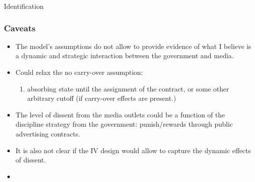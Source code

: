 \documentclass[10pt,aspectratio=169]{beamer}
\begin{document}
\begin{frame}{Identification}\frametitle{Caveats}
\small 
\begin{itemize}
    \item The model's assumptions do not allow to provide evidence of what I believe is a dynamic and strategic interaction between the government and media. 
    \item Could relax the no carry-over assumption: 
    \begin{enumerate}
        \item \alert{absorbing} state until the assignment of the contract, or some other arbitrary cutoff (if carry-over effects are present.)
    \end{enumerate}
    \item The level of dissent from the media outlets could be a function of the discipline strategy from the government: punish/rewards through public advertising contracts.
    \item It is also not clear if the IV design would allow to capture the dynamic effects of dissent.
    \item 
\end{itemize}

\end{frame}

\begin{frame}[allowframebreaks]
    
    \typeout{}

    \singlespacing
    
    
    
\end{frame}
\end{document}
